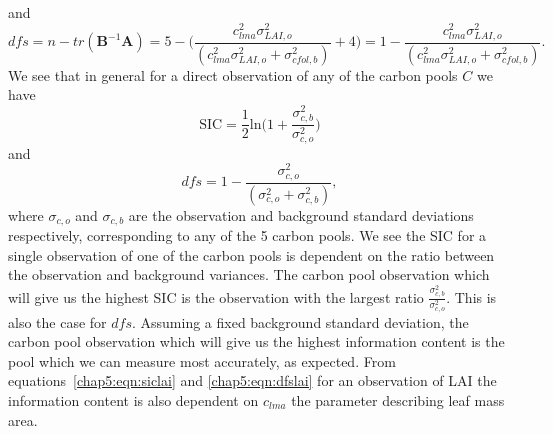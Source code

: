 and 
\begin{equation}
dfs = n - tr(\textbf{B}^{-1}\textbf{A}) = 5 - \bigg(\frac{c_{lma}^2 \sigma_{LAI,o}^{2}}{(c_{lma}^2 \sigma_{LAI,o}^{2}+\sigma_{cfol,b}^{2})} + 4 \bigg) = 1 -\frac{c_{lma}^2 \sigma_{LAI,o}^{2}}{(c_{lma}^2 \sigma_{LAI,o}^{2}+\sigma_{cfol,b}^{2})}. \label{chap5:eqn:dfslai}
\end{equation}
We see that in general for a direct observation of any of the carbon pools $C$ we have
\begin{equation}
\text{SIC} =\frac{1}{2}\text{ln} \bigg(1+\frac{\sigma_{c,b}^{2}}{\sigma_{c,o}^{2}}\bigg) \label{chap5:eqn:sicC}
\end{equation}
and 
\begin{equation}
dfs = 1 -\frac{\sigma_{c,o}^{2}}{(\sigma_{c,o}^{2}+\sigma_{c,b}^{2})}, \label{chap5:eqn:dfsC}
\end{equation}
where $\sigma_{c,o}$ and $\sigma_{c,b}$ are the observation and background standard deviations respectively, corresponding to any of the 5 carbon pools.
We see the SIC for a single observation of one of the carbon pools is dependent on the ratio between the observation and background variances. The carbon pool observation which will give us the highest SIC is the observation with the largest ratio $\frac{\sigma_{c,b}^{2}}{\sigma_{c,o}^{2}}$. This is also the case for $dfs$. Assuming a fixed background standard deviation, the carbon pool observation which will give us the highest information content is the pool which we can measure most accurately, as expected. From equations~\eqref{chap5:eqn:siclai} and \eqref{chap5:eqn:dfslai} for an observation of LAI the information content is also dependent on $c_{lma}$ the parameter describing leaf mass area.

